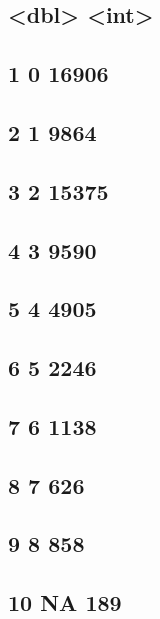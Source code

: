 \begin{userprompt}
\subsection{<dbl> <int>}

\subsection{1 0 16906}

\subsection{2 1 9864}

\subsection{3 2 15375}

\subsection{4 3 9590}

\subsection{5 4 4905}

\subsection{6 5 2246}

\subsection{7 6 1138}

\subsection{8 7 626}

\subsection{9 8 858}

\subsection{10 NA 189}


\end{userprompt}
